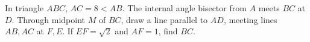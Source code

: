 In triangle $ABC$, $AC=8<AB$. The internal angle bisector from $A$ meets $BC$ at $D$. Through midpoint $M$ of $BC$, draw a line parallel to $AD$, meeting lines $AB,AC$ at $F,E$. If $EF=\sqrt2$ and $AF=1$, find $BC$.
